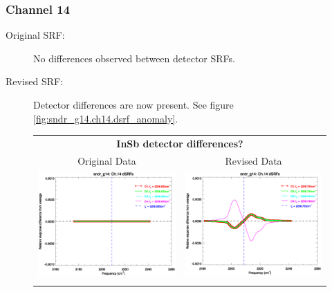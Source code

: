 \subsubsection{Channel 14}
\begin{description}
  \item[Original SRF:] No differences observed between detector SRFs.
  \item[Revised SRF:]  Detector differences are now present. See figure \ref{fig:sndr_g14.ch14.dsrf_anomaly}.
\end{description}

\begin{figure}[htp]
  \centering
  \begin{tabular}{c c}
    \multicolumn{2}{c}{\textsf{\bfseries InSb detector differences?}} \\
    \hspace{1.5em}\textsf{Original Data} &
    \hspace{1.5em}\textsf{Revised Data} \\
    \includegraphics[scale=0.5,trim=0 40 0 0]{graphics/dsrf_anomaly/original/sndr_g14.ch14.srf.eps} &
    \includegraphics[scale=0.5,trim=0 40 0 0]{graphics/dsrf_anomaly/revised/sndr_g14.ch14.srf.eps} \\\\

\end{tabular}
\end{figure}

